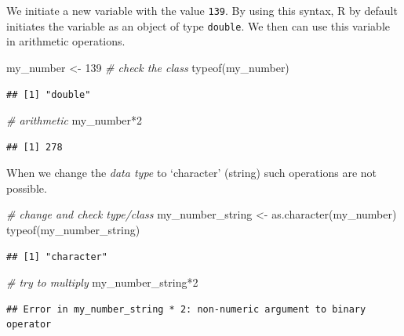 \documentclass[
  12pt,
]{style/krantz}
\newenvironment{Shaded}{\begin{snugshade}}{\end{snugshade}}
\newcommand{\CommentTok}[1]{\textcolor[rgb]{0.56,0.35,0.01}{\textit{#1}}}
\newcommand{\DecValTok}[1]{\textcolor[rgb]{0.00,0.00,0.81}{#1}}
\newcommand{\FunctionTok}[1]{\textcolor[rgb]{0.00,0.00,0.00}{#1}}
\newcommand{\NormalTok}[1]{#1}
\newcommand{\OtherTok}[1]{\textcolor[rgb]{0.56,0.35,0.01}{#1}}
\newcommand{\SpecialCharTok}[1]{\textcolor[rgb]{0.00,0.00,0.00}{#1}}
\begin{document}
We initiate a new variable with the value \texttt{139}. By using this syntax, R by default initiates the variable as an object of type \texttt{double}. We then can use this variable in arithmetic operations.

\begin{Shaded}
\begin{Highlighting}[]
\NormalTok{my\_number }\OtherTok{\textless{}{-}} \DecValTok{139}
\CommentTok{\# check the class}
\FunctionTok{typeof}\NormalTok{(my\_number)}
\end{Highlighting}
\end{Shaded}

\begin{verbatim}
## [1] "double"
\end{verbatim}

\begin{Shaded}
\begin{Highlighting}[]
\CommentTok{\# arithmetic}
\NormalTok{my\_number}\SpecialCharTok{*}\DecValTok{2}
\end{Highlighting}
\end{Shaded}

\begin{verbatim}
## [1] 278
\end{verbatim}

When we change the \emph{data type} to `character' (string) such operations are not possible.

\begin{Shaded}
\begin{Highlighting}[]
\CommentTok{\# change and check type/class}
\NormalTok{my\_number\_string }\OtherTok{\textless{}{-}} \FunctionTok{as.character}\NormalTok{(my\_number)}
\FunctionTok{typeof}\NormalTok{(my\_number\_string)}
\end{Highlighting}
\end{Shaded}

\begin{verbatim}
## [1] "character"
\end{verbatim}

\begin{Shaded}
\begin{Highlighting}[]
\CommentTok{\# try to multiply}
\NormalTok{my\_number\_string}\SpecialCharTok{*}\DecValTok{2}
\end{Highlighting}
\end{Shaded}

\begin{verbatim}
## Error in my_number_string * 2: non-numeric argument to binary operator
\end{verbatim}
\end{document}
